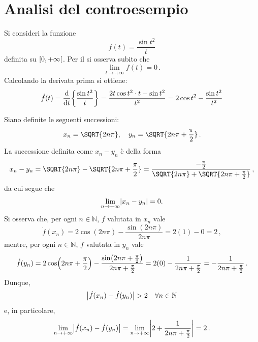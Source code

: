 \documentclass[a4paper,12pt]{article}
\begin{document}
\section{Analisi del controesempio}
\begin{example}
Si consideri la funzione
\begin{equation}
    f(t) = \frac{\sin t^2}{t}
\end{equation}
definita su $\interval[open right]{0}{+\infty}$. Per il  si osserva subito che
\begin{equation*}
    \lim_{t \to +\infty} f(t) = 0 \,.
\end{equation*}
Calcolando la derivata prima si ottiene:
\begin{equation*}
    \dot{f}(t) = \diff*{\mleft\{\frac{\sin t^2}{t}\mright\}}{t} = \frac{2t \cos t^2 \cdot t - \sin t^2}{t^2} = 2\cos t^2 - \frac{\sin t^2}{t^2}
\end{equation*}

\smallskip
Siano definite le seguenti successioni:
\begin{equation*}
    x_n = \SQRT{2n\pi}, \quad y_n = \SQRT{2n\pi + \frac{\pi}{2}} \,.
\end{equation*}
La successione definita come $x_n - y_n$ è della forma
\begin{equation*}
    x_n - y_n = \SQRT{2n\pi} - \SQRT{2n\pi + \frac{\pi}{2}} = \frac{-\frac{\pi}{2}}{\SQRT{2n\pi} + \SQRT{2n\pi + \frac{\pi}{2}}} \,,
\end{equation*}
da cui segue che
\begin{equation}\label{eq:barbalat_contr5}
    \lim_{n \to +\infty} \mleft| x_n - y_n \mright| = 0.
\end{equation}
Si osserva che, per ogni $n \in \mathbb{N}$, $\dot{f}$ valutata in $x_n$ vale
\begin{equation*}
    \dot{f}(x_n) = 2\cos(2n\pi) - \frac{\sin(2n\pi)}{2n\pi} = 2(1) - 0 = 2 \, ,
\end{equation*}
mentre, per ogni $n \in \mathbb{N}$, $\dot{f}$ valutata in $y_n$ vale
\begin{equation*}
    \dot{f}(y_n) = 2\cos\mleft(2n\pi + \frac{\pi}{2}\mright) - \frac{\sin\mleft(2n\pi + \frac{\pi}{2}\mright)}{2n\pi + \frac{\pi}{2}} = 2(0) - \frac{1}{2n\pi + \frac{\pi}{2}} = - \frac{1}{2n\pi + \frac{\pi}{2}} \,.
\end{equation*}
Dunque, 
\begin{equation*}
  \mleft| \dot{f}(x_n) - \dot{f}(y_n) \mright| > 2 \quad \forall n \in \mathbb{N}
\end{equation*}
e, in particolare,
\begin{equation*}
    \lim_{n \to +\infty} \mleft| \dot{f}(x_n) - \dot{f}(y_n) \mright| = \lim_{n \to +\infty} \mleft| 2 + \frac{1}{2n\pi + \frac{\pi}{2}} \mright| = 2 \,.
\end{equation*}


\end{example}
\end{document}
